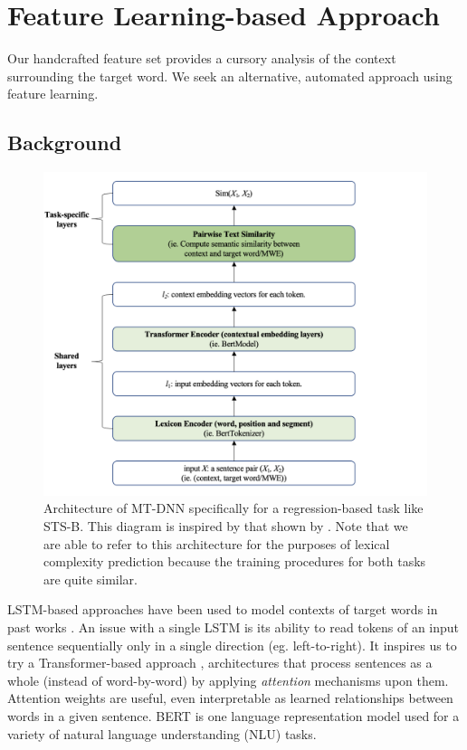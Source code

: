 \documentclass{dcthesis}
\theoremstyle{definition}
\theoremstyle{remark}
\begin{document}
\section{Feature Learning-based Approach}

Our handcrafted feature set provides a cursory analysis of the context surrounding the target word. We seek an alternative, automated approach using feature learning.

\subsection{Background}

\begin{figure}
  \centering
  \includegraphics[scale=0.75]{architecture.png}
  \caption{\label{fig:architecture} Architecture of MT-DNN specifically for a regression-based task like STS-B. This diagram is inspired by that shown by \citet{liu2019multi}. Note that we are able to refer to this architecture for the purposes of lexical complexity prediction because the training procedures for both tasks are quite similar.}
\end{figure}

LSTM-based approaches have been used to model contexts of target words in past works \citep{hartmann2018nilc, de2018deep}. An issue with a single LSTM is its ability to read tokens of an input sentence sequentially only in a single direction (eg. left-to-right). It inspires us to try a Transformer-based approach \citep{vaswani2017attention}, architectures that process sentences as a whole (instead of word-by-word) by applying \textit{attention} mechanisms upon them. Attention weights are useful, even interpretable as learned relationships between words in a given sentence. BERT \citep{devlin2018bert} is one language representation model used for a variety of natural language understanding (NLU) tasks.
\end{document}

